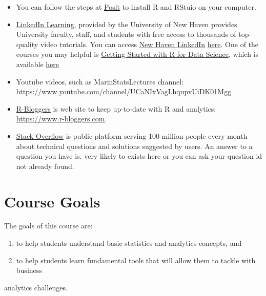 \documentclass[11pt,]{article}
\providecommand{\tightlist}{%
  \setlength{\itemsep}{0pt}\setlength{\parskip}{0pt}}
\begin{document}
\begin{itemize}
\tightlist
\item
  You can follow the steps at
  \href{https://posit.co/download/rstudio-desktop/}{Posit} to install R
  and RStuio on your computer.
\item
  \href{https://technology.newhaven.edu/linkedin-learning/}{LinkedIn
  Learning}, provided by the University of New Haven provides University
  faculty, staff, and students with free access to thousands of
  top-quality video tutorials. You can access
  \href{https://technology.newhaven.edu/linkedin-learning/}{New Haven
  LinkedIn}
  \href{https://technology.newhaven.edu/linkedin-learning/}{here}. One
  of the courses you may helpful is
  \href{https://www.linkedin.com/learning/paths/getting-started-with-r-for-data-science?u=2359714}{Getting
  Started with R for Data Science}, which is available
  \href{https://www.linkedin.com/learning/paths/getting-started-with-r-for-data-science?u=2359714}{here}
\item
  Youtube videos, such as MarinStatsLectures channel:
  \url{https://www.youtube.com/channel/UCaNIxVagLhqupvUiDK01Mgg}
\item
  \href{https://www.r-bloggers.com}{R-Bloggers} is web site to keep
  up-to-date with R and analytics: \url{https://www.r-bloggers.com}.
\item
  \href{https://stackoverflow.com/questions}{Stack Overflow} is public
  platform serving 100 million people every month about technical
  questions and solutions suggested by users. An answer to a question
  you have is. very likely to exists here or you can ask your question
  id not already found.
\end{itemize}

\hypertarget{course-goals}{%
\section{Course Goals}\label{course-goals}}

The goals of this course are:

\begin{enumerate}
\def\labelenumi{\arabic{enumi}.}
\tightlist
\item
  to help students understand basic statistics and analytics concepts,
  and
\item
  to help students learn fundamental tools that will allow them to
  tackle with business
\end{enumerate}

analytics challenges.
\end{document}
